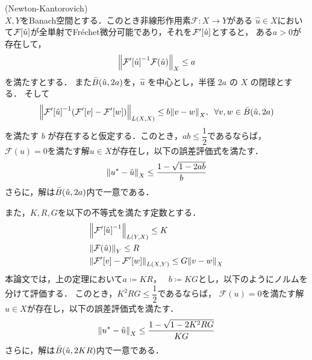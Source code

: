 \begin{定理} (Newton-Kantorovich)\\
  \(X,Y\)をBanach空間とする．このとき非線形作用素\(\mathcal{F}\colon X\rightarrow Y \)がある
  \(\hat{u}\in X\)において\(\mathcal{F}\qty[\hat{u}]\)が全単射でFr\'{e}chet微分可能であり，それを\(\mathcal{F}'\qty[\hat{u}]\)とすると，
  ある\(a > 0\)が存在して，
  \begin{align}
    \norm{\mathcal{F}'\qty[\hat{u}]^{-1} \mathcal{F}\qty(\hat{u})}_X \leq a
  \end{align}
  を満たすとする．
  また\(\bar{B}\qty(\hat{u},2a)\)を，\(\hat{u}\) を中心とし，半径 \(2a\) の \(X\) の閉球とする．
  そして
  \begin{align}
    \norm{\mathcal{F}'\qty[\hat{u}]^{-1} \qty(\mathcal{F}'\qty[v]-\mathcal{F}'\qty[w])}_{L(X , X)}
    \leq
    b\norm{v-w}_X,\;\;\forall v,w \in \bar{B}\qty(\hat{u}, 2a)
  \end{align}
  を満たす \(b\) が存在すると仮定する．このとき，\(ab \leq \dfrac{1}{2}\)であるならば，
  \(\mathcal{F}(u) =0 \)を満たす解\(u \in X\)が存在し，以下の誤差評価式を満たす．
  \begin{align}
    \norm{u^*-\hat{u}}_X \leq \dfrac{1-\sqrt{1-2ab}}{b}
  \end{align}
  さらに，解は\(\bar{B}\qty(\hat{u},2a)\)内で一意である．
\end{定理}
また，\(K,R,G\)を以下の不等式を満たす定数とする．
\begin{align}
    &\norm{\mathcal{F}'\qty[\hat{u}]^{-1}}_{L(Y,X)} \leq K\\
    &\norm{\mathcal{F}\qty(\hat{u})}_{Y} \leq R\\
    &\norm{\mathcal{F}'\qty[v]-\mathcal{F}'\qty[w]}_{L(X , Y)} \leq G\norm{v-w}_X
\end{align}
本論文では，上の定理において\(a\coloneqq KR，\;\;\;b\coloneqq KG\)とし，以下のようにノルムを分けて評価する．
このとき，\(K^2RG \leq \dfrac{1}{2}\)であるならば，
  \(\mathcal{F}(u) =0 \)を満たす解\(u \in X\)が存在し，以下の誤差評価式を満たす．
  \begin{align}
    \norm{u^*-\hat{u}}_X \leq \dfrac{1-\sqrt{1-2K^2RG}}{KG}
  \end{align}
  さらに，解は\(\bar{B}\qty(\hat{u},2KR)\)内で一意である．
